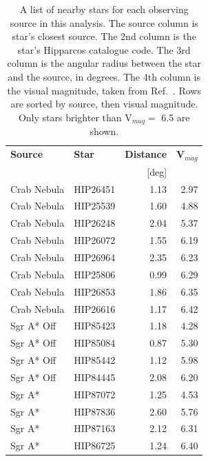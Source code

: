     \begin{table}[]
      \centering
      \caption{
        A list of nearby stars for each observing source in this analysis.
        The source column is star's closest source.
        The 2nd column is the star's Hipparcos catalogue code.
        The 3rd column is the angular radius between the star and the source, in degrees.
        The 4th column is the visual magnitude, taken from Ref.~\cite{hipparcos_catalogue}.
        Rows are sorted by source, then visual magnitude.
        Only stars brighter than V${}_{mag}=$ 6.5 are shown.
      }
      \label{tab:brightstars}
      \begin{tabular}{|l|l|r|r|}
        \hline
        \textbf{Source} & \textbf{Star} & \textbf{Distance} & \textbf{V${}_{mag}$} \\ 
                        &               & [deg]             &                      \\
        \hline
        Crab Nebula & HIP26451 & 1.13 & 2.97 \\
        Crab Nebula & HIP25539 & 1.60 & 4.88 \\
        Crab Nebula & HIP26248 & 2.04 & 5.37 \\
        Crab Nebula & HIP26072 & 1.55 & 6.19 \\
        Crab Nebula & HIP26964 & 2.35 & 6.23 \\
        Crab Nebula & HIP25806 & 0.99 & 6.29 \\
        Crab Nebula & HIP26853 & 1.86 & 6.35 \\
        Crab Nebula & HIP26616 & 1.17 & 6.42 \\
        \hline
        Sgr A* Off  & HIP85423 & 1.18 & 4.28 \\
        Sgr A* Off  & HIP85084 & 0.87 & 5.30 \\
        Sgr A* Off  & HIP85442 & 1.12 & 5.98 \\
        Sgr A* Off  & HIP84445 & 2.08 & 6.20 \\
        \hline
        Sgr A*      & HIP87072 & 1.25 & 4.53 \\
        Sgr A*      & HIP87836 & 2.60 & 5.76 \\
        Sgr A*      & HIP87163 & 2.12 & 6.31 \\
        Sgr A*      & HIP86725 & 1.24 & 6.40 \\
        \hline
      \end{tabular}
    \end{table}

